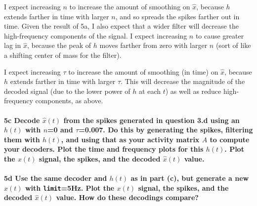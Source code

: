 \documentclass{article}
\begin{document}
    I expect increasing $n$ to increase the amount of smoothing on
$\hat{x}$, because $h$ extends farther in time with larger $n$, and so
spreads the spikes farther out in time. Given the result of 5a, I also
expect that a wider filter will decrease the high-frequency components
of the signal. I expect increasing $n$ to cause greater lag in
$\hat{x}$, because the peak of $h$ moves farther from zero with larger
$n$ (sort of like a shifting center of mass for the filter).

    I expect increasing $\tau$ to increase the amount of smoothing (in time)
on $\hat{x}$, because $h$ extends farther in time with larger $\tau$.
This will decrease the magnitude of the decoded signal (due to the lower
power of $h$ at each $t$) as well as reduce high-frequency components,
as above.

    \paragraph{5c Decode $\hat{x}(t)$ from the spikes generated in question
3.d using an $h(t)$ with $n$=0 and $\tau$=0.007. Do this by generating
the spikes, filtering them with $h(t)$, and using that as your activity
matrix $A$ to compute your decoders. Plot the time and frequency plots
for this $h(t)$. Plot the $x(t)$ signal, the spikes, and the decoded
$\hat{x}(t)$
value.}\label{c-decode-hatxt-from-the-spikes-generated-in-question-3.d-using-an-ht-with-n0-and-tau0.007.-do-this-by-generating-the-spikes-filtering-them-with-ht-and-using-that-as-your-activity-matrix-a-to-compute-your-decoders.-plot-the-time-and-frequency-plots-for-this-ht.-plot-the-xt-signal-the-spikes-and-the-decoded-hatxt-value.}

    \paragraph{5d Use the same decoder and $h(t)$ as in part (c), but
generate a new $x(t)$ with \texttt{limit}=5Hz. Plot the $x(t)$ signal,
the spikes, and the decoded $\hat{x}(t)$ value. How do these decodings
compare?}\label{d-use-the-same-decoder-and-ht-as-in-part-c-but-generate-a-new-xt-with-limit5hz.-plot-the-xt-signal-the-spikes-and-the-decoded-hatxt-value.-how-do-these-decodings-compare}
\end{document}
